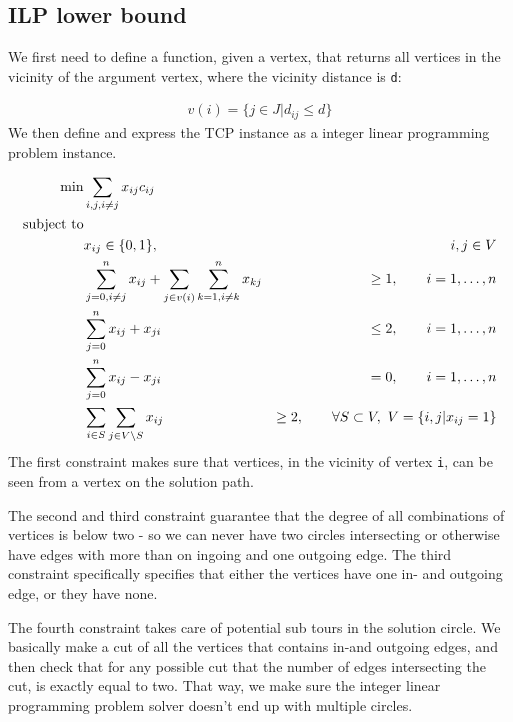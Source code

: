 \subsection{ILP lower bound}

We first need to define a function, given a vertex, that returns all vertices
in the vicinity of the argument vertex, where the vicinity distance is
\texttt{d}:

\begin{align}
    v(i) = \{j \in J | d_{ij} \leq d\}
\end{align}
We then define and express the TCP instance as a integer linear programming
problem instance.

\begin{align*}
    \min             & \sum_{i,j, i \not= j} x_{ij} c_{ij} & \\
    \text{subject to}& &\\
                     & x_{ij} \in \{0,1\}, &\hspace{2em} i,j \in V\\
                     & \sum_{j=0,i\neq j}^{n} x_{ij} + \sum_{j \in v(i)} \sum_{k = 1, i \neq k}^n x_{kj}          &\geq 1, \hspace{2em} i = 1,\hdots,n \\
                     & \sum_{j = 0}^n x_{ij} + x_{ji}                   &\leq 2, \hspace{2em} i = 1,\hdots,n \\
                     & \sum_{j = 0}^n x_{ij} - x_{ji}                   &= 0, \hspace{2em} i = 1,\hdots,n \\
                     & \sum_{i \in S} \sum_{j \in V \setminus S} x_{ij} &\geq 2, \hspace{2em} \forall S \subset V,~ V = \{i,j | x_{ij} = 1\}
\end{align*}
The first constraint makes sure that vertices, in the vicinity of vertex
\texttt{i}, can be seen from a vertex on the solution path.

The second and third constraint guarantee that the degree of all combinations
of vertices is below two - so we can never have two circles intersecting or
otherwise have edges with more than on ingoing and one outgoing edge. The
third constraint specifically specifies that either the vertices have one in-
and outgoing edge, or they have none.

The fourth constraint takes care of potential sub tours in the solution
circle. We basically make a cut of all the vertices that contains in-and
outgoing edges, and then check that for any possible cut that the number of
edges intersecting the cut, is exactly equal to two. That way, we make sure
the integer linear programming problem solver doesn't end up with multiple
circles.
